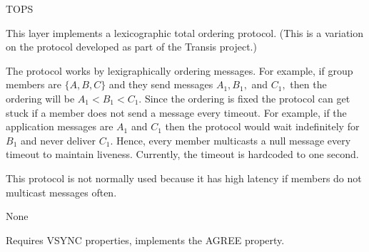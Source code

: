 %
%
%
\begin{Layer}{TOPS}

This layer implements a lexicographic total ordering protocol.  (This is
a variation on the protocol developed as part of the Transis project.)

\begin{Protocol}
The protocol works by lexigraphically ordering messages. For example,
if group members are $\{ A, B, C \}$ and they send messages $A_1,
B_1,$ and $C_1,$ then the ordering will be $A_1 < B_1 < C_1$. Since
the ordering is fixed the protocol can get stuck if a member does not
send a message every timeout. For example, if the application messages
are $A_1$ and $C_1$ then the protocol would wait indefinitely for
$B_1$ and never deliver $C_1$. Hence, every member multicasts a null
message every timeout to maintain liveness. Currently, the timeout is
hardcoded to one second.

This protocol is not normally used because it has high latency 
if members do not multicast messages often. 
\end{Protocol}

\begin{Parameters}
\item None
\end{Parameters}

\begin{Properties}
\item
Requires VSYNC properties, implements the AGREE property. 
\end{Properties}

\begin{Sources}
\end{Sources}

\end{Layer}